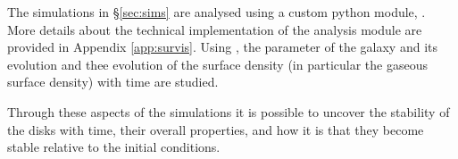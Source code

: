 The simulations in \S\ref{sec:sims} are analysed using a custom python module, \sv. 
More details about the technical implementation of the analysis module are provided in Appendix \ref{app:survis}.
Using \sv, the \citet{toomre_gravitational_1964} parameter of the galaxy and its evolution and thee evolution of the surface density (in particular the gaseous surface density) with time are studied.

Through these aspects of the simulations it is possible to uncover the stability of the disks with time, their overall properties, and how it is that they become stable relative to the initial conditions.
